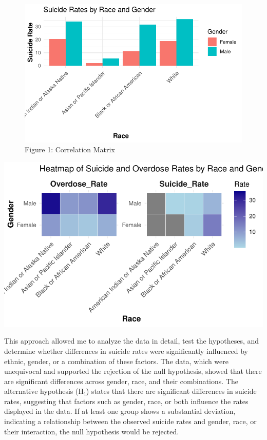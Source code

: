 \documentclass[
  letterpaper,
  DIV=11,
  numbers=noendperiod]{scrartcl}
\begin{document}
\begin{figure}[H]

{\centering \includegraphics{Sec4_Team10_files/figure-pdf/unnamed-chunk-7-1.pdf}

}

\caption{Figure 1: Correlation Matrix}

\end{figure}%

\includegraphics{Sec4_Team10_files/figure-pdf/unnamed-chunk-8-1.pdf}

This approach allowed me to analyze the data in detail, test the
hypotheses, and determine whether differences in suicide rates were
significantly influenced by ethnic, gender, or a combination of these
factors. The data, which were unequivocal and supported the rejection of
the null hypothesis, showed that there are significant differences
across gender, race, and their combinations. The alternative hypothesis
(H₁) states that there are significant differences in suicide rates,
suggesting that factors such as gender, race, or both influence the
rates displayed in the data. If at least one group shows a substantial
deviation, indicating a relationship between the observed suicide rates
and gender, race, or their interaction, the null hypothesis would be
rejected.
\end{document}
